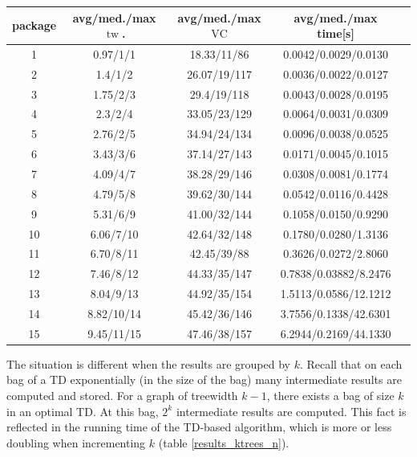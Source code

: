 \documentclass[11pt,a4paper]{article}
\DeclareMathOperator{\tw}{tw}
\DeclareMathOperator{\VC}{VC}
\begin{document}
\begin{center}
\begin{table}[h!]
\centering
\begin{tabular}{|c|c|c|c|c|}
\hline
package & avg/med./max $\tw$. & avg/med./max $\VC$ & avg/med./max time[s] \\
\hline \hline
1 & 0.97/1/1 & 18.33/11/86 & 0.0042/0.0029/0.0130 \\
\hline
2 & 1.4/1/2 & 26.07/19/117 & 0.0036/0.0022/0.0127 \\
\hline
3 & 1.75/2/3 & 29.4/19/118 & 0.0043/0.0028/0.0195 \\
\hline
4 & 2.3/2/4 & 33.05/23/129 & 0.0064/0.0031/0.0309 \\
\hline
5 & 2.76/2/5 & 34.94/24/134 & 0.0096/0.0038/0.0525 \\
\hline
6 & 3.43/3/6 & 37.14/27/143 & 0.0171/0.0045/0.1015 \\
\hline
7 & 4.09/4/7 & 38.28/29/146 & 0.0308/0.0081/0.1774 \\
\hline
8 & 4.79/5/8 & 39.62/30/144 & 0.0542/0.0116/0.4428 \\
\hline
9 & 5.31/6/9 & 41.00/32/144 & 0.1058/0.0150/0.9290 \\
\hline
10 & 6.06/7/10 & 42.64/32/148 & 0.1780/0.0280/1.3136 \\
\hline
11 & 6.70/8/11 & 42.45/39/88 & 0.3626/0.0272/2.8060 \\
\hline
12 & 7.46/8/12 & 44.33/35/147 & 0.7838/0.03882/8.2476 \\
\hline
13 & 8.04/9/13 & 44.92/35/154 & 1.5113/0.0586/12.1212 \\
\hline
14 & 8.82/10/14 & 45.42/36/146 & 3.7556/0.1338/42.6301 \\
\hline
15 & 9.45/11/15 & 47.46/38/157 & 6.2944/0.2169/44.1330 \\
\hline
\end{tabular}
\label{results_ktrees_k}
\end{table}
\end{center}

The situation is different when the results are grouped by $k$. Recall that on each bag of a TD exponentially (in the size of the bag) many intermediate results are computed and stored. For a graph of treewidth $k-1$, there exists a bag of size $k$ in an optimal TD. At this bag, $2^{k}$ intermediate results are computed. This fact is reflected in the running time of the TD-based algorithm, which is more or less doubling when incrementing $k$ (table \ref{results_ktrees_n}).
\end{document}
